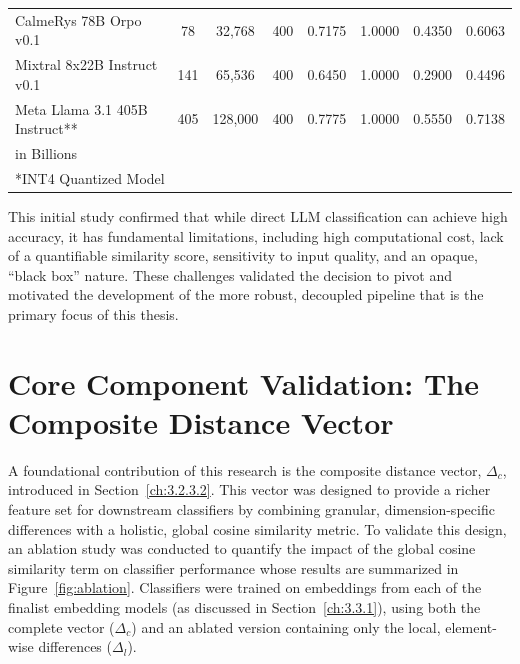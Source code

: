 \begin{table}[!htbp]
{\begin{tabular}{lccccccc}
            CalmeRys 78B Orpo v0.1          & 78                   & 32,768                          & 400              & 0.7175            & 1.0000 & 0.4350          & 0.6063          \\
            Mixtral 8x22B Instruct v0.1     & 141                  & 65,536                          & 400              & 0.6450            & 1.0000 & 0.2900          & 0.4496          \\
            Meta Llama 3.1 405B Instruct**  & 405                  & 128,000                         & 400              & 0.7775            & 1.0000 & 0.5550          & 0.7138          \\
            \bottomrule
            \multicolumn{8}{l}{\footnotesize *in Billions}                                                                                                                               \\
            \multicolumn{8}{l}{\footnotesize **INT4 Quantized Model}
        \end{tabular}
    }
\end{table}

This initial study confirmed that while direct LLM classification can achieve high accuracy, it has fundamental limitations, including high computational cost, lack of a quantifiable similarity score, sensitivity to input quality, and an opaque, ``black box'' nature. These challenges validated the decision to pivot and motivated the development of the more robust, decoupled pipeline that is the primary focus of this thesis.

\section{Core Component Validation: The Composite Distance Vector}\label{ch:4.3}
A foundational contribution of this research is the composite distance vector, \(\Delta_c\), introduced in Section~\ref{ch:3.2.3.2}. This vector was designed to provide a richer feature set for downstream classifiers by combining granular, dimension-specific differences with a holistic, global cosine similarity metric. To validate this design, an ablation study was conducted to quantify the impact of the global cosine similarity term on classifier performance whose results are summarized in Figure~\ref{fig:ablation}. Classifiers were trained on embeddings from each of the finalist embedding models (as discussed in Section~\ref{ch:3.3.1}), using both the complete vector (\(\Delta_c\)) and an ablated version containing only the local, element-wise differences (\(\Delta_l\)).

